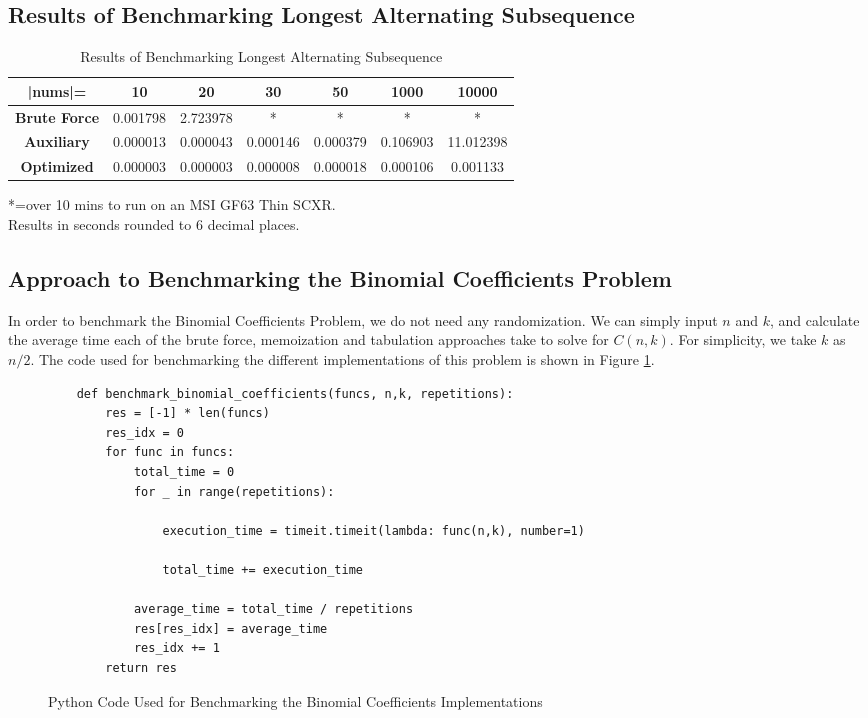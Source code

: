 \subsection{Results of Benchmarking Longest Alternating Subsequence}
\begin{table}[H]
    \centering
    \begin{tabular}{|c|c|c|c|c|c|c|}
        \hline
        \textbf{|nums|=}  & \textbf{10} & \textbf{20} & \textbf{30} & \textbf{50} & \textbf{1000}  & \textbf{10000} \\
        \hline
        \textbf{Brute Force} & 0.001798 & 2.723978 & * & * & * & * \\
        \hline
        \textbf{Auxiliary} & 0.000013 & 0.000043 & 0.000146 & 0.000379 & 0.106903 & 11.012398 \\
        \hline
        \textbf{Optimized} &  0.000003 & 0.000003 & 0.000008 & 0.000018 & 0.000106 & 0.001133 \\
        \hline
    \end{tabular}
    \caption{Results of Benchmarking Longest Alternating Subsequence}
\end{table}
*=over 10 mins to run on an MSI GF63 Thin SCXR.\\
Results in seconds rounded to 6 decimal places.


\subsection{Approach to Benchmarking the Binomial Coefficients Problem}
In order to benchmark the Binomial Coefficients Problem, we do not need any randomization. We can simply input $n$ and $k$, and calculate the average time each of the brute force, memoization and tabulation approaches take to solve for $C(n,k)$.
For simplicity, we take $k$ as $n/2$.
The code used for benchmarking the different implementations of this problem is shown in Figure \ref{fig:bm-binomial}.

\begin{figure}[H]
    \centering
    \begin{lstlisting}
    def benchmark_binomial_coefficients(funcs, n,k, repetitions):
        res = [-1] * len(funcs)
        res_idx = 0
        for func in funcs:
            total_time = 0
            for _ in range(repetitions):
    
                execution_time = timeit.timeit(lambda: func(n,k), number=1)
    
                total_time += execution_time
    
            average_time = total_time / repetitions
            res[res_idx] = average_time
            res_idx += 1
        return res
    \end{lstlisting}
    \caption{Python Code Used for Benchmarking the Binomial Coefficients Implementations}
    \label{fig:bm-binomial}
\end{figure}

